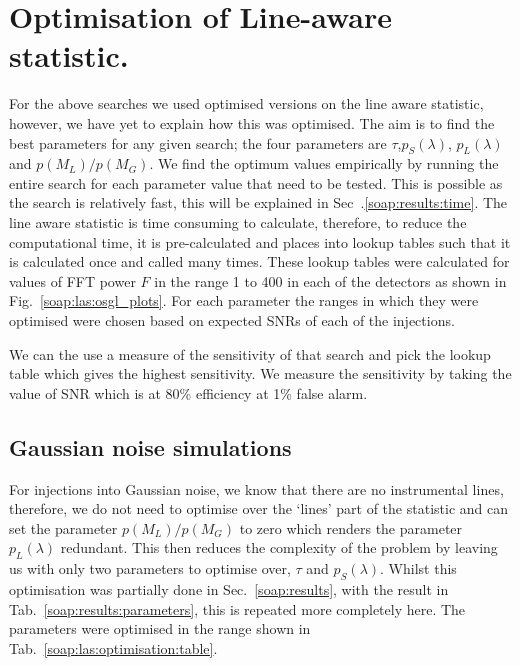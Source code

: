 \section{\label{soap:las:optimisation}Optimisation of Line-aware statistic.}

For the above searches we used optimised versions on the line aware statistic, however, we have yet to explain how this was optimised. 
The aim is to find the best parameters for any given search; the four parameters are $\tau$,$p_S(\lambda)$, $p_L(\lambda)$ and $p(M_L)/p(M_G)$.
We find the optimum values empirically by running the entire search for each parameter value that need to be tested. This is possible as the search is relatively fast, this will be explained in Sec~.\ref{soap:results:time}. 
The line aware statistic is time consuming to calculate, therefore, to reduce the computational time, it is pre-calculated and places into lookup tables such that it is calculated once and called many times. 
These lookup tables were calculated for values of \gls{FFT} power $F$ in the range 1 to 400 in each of the detectors as shown in Fig.~\ref{soap:las:osgl_plots}. For each parameter the ranges in which they were optimised were chosen based on expected \glspl{SNR} of each of the injections. 

We can the use a measure of the sensitivity of that search and pick the lookup table which gives the highest sensitivity. 
We measure the sensitivity by taking the value of \gls{SNR} which is at 80\% efficiency at 1\% false alarm. 

\subsection{Gaussian noise simulations}

For injections into Gaussian noise, we know that there are no instrumental lines, therefore, we do not need to optimise over the `lines' part of the statistic and can set the parameter $p(M_L)/p(M_G)$ to zero which renders the parameter $p_L(\lambda)$ redundant. 
This then reduces the complexity of the problem by leaving us with only two parameters to optimise over, $\tau$ and $p_S(\lambda)$. 
Whilst this optimisation was partially done in Sec.~\ref{soap:results}, with the result in Tab.~\ref{soap:results:parameters}, this is repeated more completely here.
The parameters were optimised in the range shown in Tab.~\ref{soap:las:optimisation:table}. 

